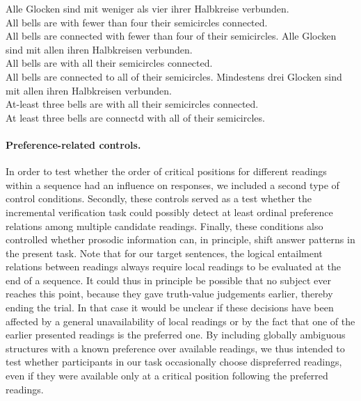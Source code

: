 \documentclass[fleqn,reqno,10pt,draft]{article}
\begin{document}
\begin{exe}
\ex \label{bsp:controls-es}
  \begin{xlist}
\ex \label{bsp:controls-es-1} \gll Alle Glocken sind mit weniger als
  vier ihrer Halbkreise verbunden. \\ 
All bells are with fewer than four their semicircles connected.\\
\trans All bells are connected with fewer than four of their semicircles.  
\ex \label{bsp:controls-es-2} \gll Alle Glocken sind mit allen ihren Halbkreisen verbunden.\\
All bells are with all their semicircles connected.\\
\trans All bells are connected to all of their semicircles. 
\ex \label{bsp:controls-es-3} \gll Mindestens drei Glocken sind mit
  allen ihren Halbkreisen verbunden.\\ 
  At-least three bells are with all  their semicircles connected.\\
  \trans At least three bells are connectd with all of their semicircles.
\end{xlist}
\end{exe}

\paragraph{Preference-related controls.} In order to test whether the
order of critical positions for different readings within a sequence
had an influence on responses, we included a second type of control
conditions. Secondly, these controls served as a test whether the
incremental verification task could possibly detect at least ordinal
preference relations among multiple candidate readings. Finally, these
conditions also controlled whether prosodic information can, in
principle, shift answer patterns in the present task. Note that for
our target sentences, the logical entailment relations between
readings always require local readings to be evaluated at the end of a
sequence. It could thus in principle be possible that no subject ever
reaches this point, because they gave truth-value judgements earlier,
thereby ending the trial. In that case it would be unclear if these
decisions have been affected by a general unavailability of local
readings or by the fact that one of the earlier presented readings is
the preferred one. By including globally ambiguous structures with a
known preference over available readings, we thus intended to test
whether participants in our task occasionally choose dispreferred
readings, even if they were available only at a critical position
following the preferred readings.
\end{document}
